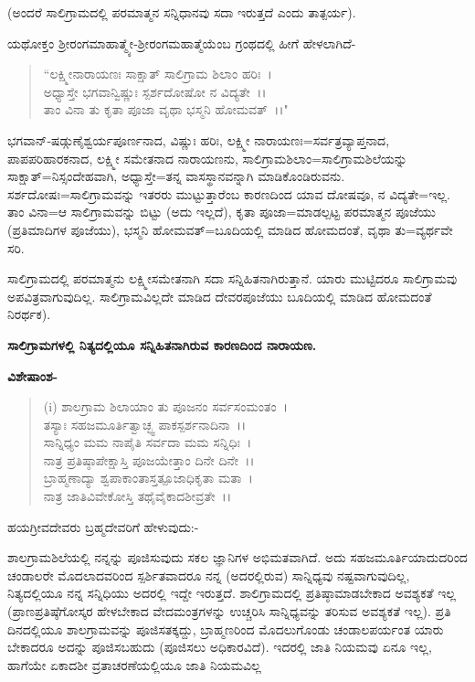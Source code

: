 (ಅಂದರೆ ಸಾಲಿಗ್ರಾಮದಲ್ಲಿ ಪರಮಾತ್ಮನ ಸನ್ನಿಧಾನವು ಸದಾ ಇರುತ್ತದೆ ಎಂದು ತಾತ್ಪರ್ಯ).

ಯಥೋಕ್ತಂ ಶ‍್ರೀರಂಗಮಾಹಾತ್ಮ್ಯೇ-ಶ‍್ರೀರಂಗಮಹಾತ್ಮೆಯೆಂಬ ಗ್ರಂಥದಲ್ಲಿ ಹೀಗೆ ಹೇಳಲಾಗಿದೆ-

\begin{verse}
``ಲಕ್ಷ್ಮೀನಾರಾಯಣಃ ಸಾಕ್ಷಾತ್ ಸಾಲಿಗ್ರಾಮ ಶಿಲಾಂ ಹರಿಃ~।\\ ಅಧ್ಯಾಸ್ತೇ ಭಗವಾನ್ವಿಷ್ಣುಃ ಸ್ಪರ್ಶದೋಷೋ ನ ವಿದ್ಯತೇ~।।\\ ತಾಂ ವಿನಾ ತು ಕೃತಾ ಪೂಜಾ ವೃಥಾ ಭಸ್ಮನಿ ಹೋಮವತ್~।।"
\end{verse}


ಭಗವಾನ್-ಷಡ್ಗುಣೈಶ್ವರ್ಯಪೂರ್ಣನಾದ, ವಿಷ್ಣುಃ ಹರಿಃ, ಲಕ್ಷ್ಮೀ ನಾರಾಯಣಃ=ಸರ್ವತ್ರವ್ಯಾಪ್ತನಾದ, ಪಾಪಪರಿಹಾರಕನಾದ, ಲಕ್ಷ್ಮೀ ಸಮೇತನಾದ ನಾರಾಯಣನು, ಸಾಲಿಗ್ರಾಮಶಿಲಾಂ=ಸಾಲಿಗ್ರಾಮಶಿಲೆಯನ್ನು ಸಾಕ್ಷಾತ್=ನಿಸ್ಸಂದೇಹವಾಗಿ, ಅಧ್ಯಾಸ್ತೇ=ತನ್ನ ವಾಸಸ್ಥಾನವನ್ನಾಗಿ ಮಾಡಿಕೊಂಡಿರುವನು. ಸರ್ಶದೋಷಃ=ಸಾಲಿಗ್ರಾಮವನ್ನು ಇತರರು ಮುಟ್ಟುತ್ತಾರೆಂಬ ಕಾರಣದಿಂದ ಯಾವ ದೋಷವೂ, ನ ವಿದ್ಯತೇ=ಇಲ್ಲ. ತಾಂ ವಿನಾ=ಆ ಸಾಲಿಗ್ರಾಮವನ್ನು ಬಿಟ್ಟು (ಅದು ಇಲ್ಲದೆ), ಕೃತಾ ಪೂಜಾ=ಮಾಡಲ್ಪಟ್ಟ ಪರಮಾತ್ಮನ ಪೂಜೆಯು (ಪ್ರತಿಮಾದಿಗಳ ಪೂಜೆಯು), ಭಸ್ಮನಿ ಹೋಮವತ್=ಬೂದಿಯಲ್ಲಿ ಮಾಡಿದ ಹೋಮದಂತೆ, ವೃಥಾ ತು=ವ್ಯರ್ಥವೇ ಸರಿ.

ಸಾಲಿಗ್ರಾಮದಲ್ಲಿ ಪರಮಾತ್ಮನು ಲಕ್ಷ್ಮೀಸಮೇತನಾಗಿ ಸದಾ ಸನ್ನಿಹಿತನಾಗಿರುತ್ತಾನೆ. ಯಾರು ಮುಟ್ಟಿದರೂ ಸಾಲಿಗ್ರಾಮವು ಅಪವಿತ್ರವಾಗುವುದಿಲ್ಲ. ಸಾಲಿಗ್ರಾಮವಿಲ್ಲದೇ ಮಾಡಿದ ದೇವರಪೂಜೆಯು ಬೂದಿಯಲ್ಲಿ ಮಾಡಿದ ಹೋಮದಂತೆ ನಿರರ್ಥಕ).

\begin{center}
\textbf{ಸಾಲಿಗ್ರಾಮಗಳಲ್ಲಿ ನಿತ್ಯದಲ್ಲಿಯೂ ಸನ್ನಿಹಿತನಾಗಿರುವ ಕಾರಣದಿಂದ ನಾರಾಯಣ.}
\end{center}

\noindent
\textbf{ವಿಶೇಷಾಂಶ-}

\begin{verse}
(i) ಶಾಲಗ್ರಾಮ ಶಿಲಾಯಾಂ ತು ಪೂಜನಂ ಸರ್ವಸಂಮಂತಂ~।\\ ತಸ್ಯಾಃ ಸಹಜಮೂರ್ತಿತ್ವಾಚ್ಛ್ವ ಪಾಕಸ್ಪರ್ಶನಾದಿನಾ~।।\\ ಸಾನ್ನಿಧ್ಯಂ ಮಮ ನಾಪೈತಿ ಸರ್ವದಾ ಮಮ ಸನ್ನಿಧಿಃ~।\\ ನಾತ್ರ ಪ್ರತಿಷ್ಠಾಪೇಕ್ಷಾಸ್ತಿ ಪೂಜಯೇತ್ತಾಂ ದಿನೇ ದಿನೇ~।।\\ ಬ್ರಾಹ್ಮಣಾದ್ಯಾ ಶ್ವಪಾಕಾಂತಾಸ್ತತ್ಪೂಜಾಧಿಕೃತಾ ಮತಾ~।\\ ನಾತ್ರ ಜಾತಿವಿವೇಕೋಸ್ತಿ ತಥೈವೈಕಾದಶೀವ್ರತೇ~।।
\end{verse}


\noindent
ಹಯಗ್ರೀವದೇವರು ಬ್ರಹ್ಮದೇವರಿಗೆ ಹೇಳುವುದು:-

ಶಾಲಗ್ರಾಮಶಿಲೆಯಲ್ಲಿ ನನ್ನನ್ನು ಪೂಜಿಸುವುದು ಸಕಲ ಜ್ಞಾನಿಗಳ ಅಭಿಮತವಾಗಿದೆ. ಅದು ಸಹಜಮೂರ್ತಿಯಾದುದರಿಂದ ಚಂಡಾಲರೇ ಮೊದಲಾದವರಿಂದ ಸ್ಪರ್ಶಿತವಾದರೂ ನನ್ನ (ಅದರಲ್ಲಿರುವ) ಸಾನ್ನಿಧ್ಯವು ನಷ್ಟವಾಗುವುದಿಲ್ಲ, ನಿತ್ಯದಲ್ಲಿಯೂ ನನ್ನ ಸನ್ನಿಧಿಯು ಅದರಲ್ಲಿ ಇದ್ದೇ ಇರುತ್ತದೆ. ಶಾಲಿಗ್ರಾಮದಲ್ಲಿ ಪ್ರತಿಷ್ಠಾಮಾಡಬೇಕಾದ ಅವಶ್ಯಕತೆ ಇಲ್ಲ (ಪ್ರಾಣಪ್ರತಿಷ್ಠೆಗೋಸ್ಕರ ಹೇಳಬೇಕಾದ ವೇದಮಂತ್ರಗಳನ್ನು ಉಚ್ಚರಿಸಿ ಸಾನ್ನಿಧ್ಯವನ್ನು ತರಿಸುವ ಅವಶ್ಯಕತೆ ಇಲ್ಲ). ಪ್ರತಿ ದಿನದಲ್ಲಿಯೂ ಶಾಲಗ್ರಾಮವನ್ನು ಪೂಜಿಸತಕ್ಕದ್ದು, ಬ್ರಾಹ್ಮಣರಿಂದ ಮೊದಲುಗೊಂಡು ಚಂಡಾಲಪರ್ಯಂತ ಯಾರು ಬೇಕಾದರೂ ಅದನ್ನು ಪೂಜಿಸಬಹುದು (ಪೂಜಿಸಲು ಅಧಿಕಾರವಿದೆ). ಇದರಲ್ಲಿ ಜಾತಿ ನಿಯಮವು ಏನೂ ಇಲ್ಲ, ಹಾಗೆಯೇ ಏಕಾದಶೀ ವ್ರತಾಚರಣೆಯಲ್ಲಿಯೂ ಜಾತಿ ನಿಯಮವಿಲ್ಲ

